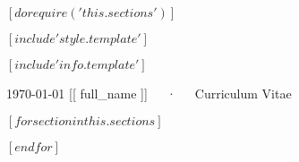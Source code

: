 $[ do require('this.sections') ]$

$[ include 'style.template' ]$

$[ include 'info.template' ]$



\makecvheader[C]

\makecvfooter
  {\today}
  {[[ full_name ]]~~~·~~~Curriculum Vitae}
  {\thepage}

$[ for section in this.sections ]$

$[ endfor ]$


